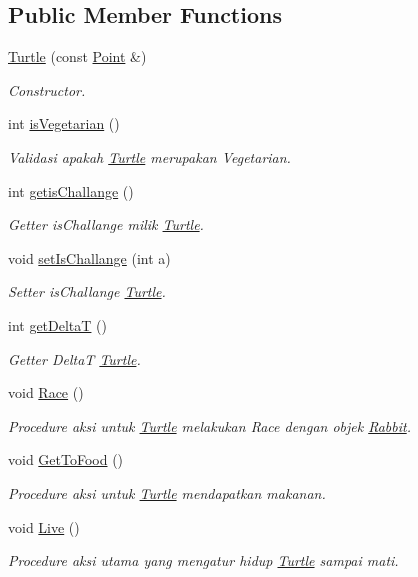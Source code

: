 \subsection*{Public Member Functions}
\begin{DoxyCompactItemize}
\item 
\hyperlink{class_turtle_a1347c5bcaee6ede82a488394cad3cf00}{Turtle} (const \hyperlink{class_point}{Point} \&)
\begin{DoxyCompactList}\small\item\em Constructor. \end{DoxyCompactList}\item 
int \hyperlink{class_turtle_aaa6ea76ca2e8b21b18ac65ef4b4663d9}{is\+Vegetarian} ()
\begin{DoxyCompactList}\small\item\em Validasi apakah \hyperlink{class_turtle}{Turtle} merupakan Vegetarian. \end{DoxyCompactList}\item 
int \hyperlink{class_turtle_abeb5244ae5dc51006d3e1d0ca7c048c1}{getis\+Challange} ()
\begin{DoxyCompactList}\small\item\em Getter is\+Challange milik \hyperlink{class_turtle}{Turtle}. \end{DoxyCompactList}\item 
void \hyperlink{class_turtle_a01eb5b88af5f7cc0550ee836be552a37}{set\+Is\+Challange} (int a)
\begin{DoxyCompactList}\small\item\em Setter is\+Challange \hyperlink{class_turtle}{Turtle}. \end{DoxyCompactList}\item 
int \hyperlink{class_turtle_a707d466a9d8ce18d27367b49403249d7}{get\+DeltaT} ()
\begin{DoxyCompactList}\small\item\em Getter DeltaT \hyperlink{class_turtle}{Turtle}. \end{DoxyCompactList}\item 
void \hyperlink{class_turtle_acf11aca3cdcf6aeebac4aac8c2ec416f}{Race} ()
\begin{DoxyCompactList}\small\item\em Procedure aksi untuk \hyperlink{class_turtle}{Turtle} melakukan Race dengan objek \hyperlink{class_rabbit}{Rabbit}. \end{DoxyCompactList}\item 
void \hyperlink{class_turtle_a1f2ab308068556b2621d5acd8eda5413}{Get\+To\+Food} ()
\begin{DoxyCompactList}\small\item\em Procedure aksi untuk \hyperlink{class_turtle}{Turtle} mendapatkan makanan. \end{DoxyCompactList}\item 
void \hyperlink{class_turtle_abac9610f1eb0b0894b91cd86173bc257}{Live} ()
\begin{DoxyCompactList}\small\item\em Procedure aksi utama yang mengatur hidup \hyperlink{class_turtle}{Turtle} sampai mati. \end{DoxyCompactList}\end{DoxyCompactItemize}
